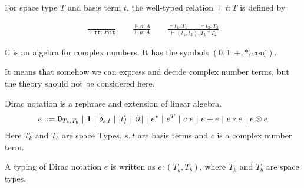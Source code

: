 
\begin{definition}
  For space type $T$ and basis term $t$, the well-typed relation $\vdash t : T$ is defined by
  
  \begin{align*}
    \frac{}{\vdash \texttt{tt} : \texttt{Unit}}
    \qquad
    \frac{\Vdash a : A}{\vdash a : A}
    \qquad
    \frac{\vdash t_1 : T_1 \qquad \vdash t_2 : T_2}{\vdash (t_1, t_2) : T_1 * T_2}
  \end{align*}
\end{definition}

\begin{postulate}
  $\mathbb{C}$ is an algebra for complex numbers. It has the symbols $(0, 1, +, *, \textrm{conj})$.
\end{postulate}
It means that somehow we can express and decide complex number terms, but the theory should not be considered here.

\begin{definition}
  Dirac notation is a rephrase and extension of linear algebra.
  \begin{align*}
    e ::= \mathbf{0}_{T_k, T_b}\ |\ \mathbf{1}\ |\ \delta_{s, t}\ |\ \ket{t}\ |\ \bra{t}\ |\ e^*\ |\ e^T\ |\ c\ e\ |\ e + e\ |\ e * e\ |\ e \otimes e
  \end{align*}
  Here $T_k$ and $T_b$ are space Types, $s, t$ are basis terms and $c$ is a complex number term.
\end{definition}

\begin{definition}
  A typing of Dirac notation $e$ is written as $e : (T_k, T_b)$, where $T_k$ and $T_b$ are space types.
\end{definition}

